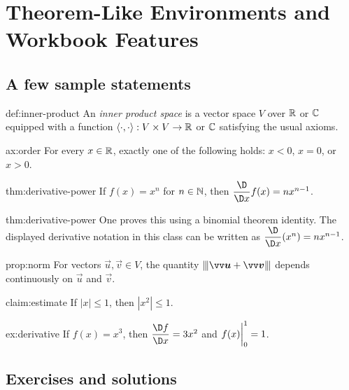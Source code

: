 \chapter{Theorem-Like Environments and Workbook Features}

\section{A few sample statements}

\begin{defn}{def:inner-product}
An \emph{inner product space} is a vector space $V$ over $\mathbb{R}$ or $\mathbb{C}$ equipped with a function
$\left\langle \cdot,\cdot \right\rangle : V\times V \to \mathbb{R}$ or $\mathbb{C}$ satisfying the usual axioms.
\end{defn}

\begin{axiom}{ax:order}
For every $x \in \mathbb{R}$, exactly one of the following holds: $x<0$, $x=0$, or $x>0$.
\end{axiom}

\begin{theo}{thm:derivative-power}
If $f(x)=x^n$ for $n\in\mathbb{N}$, then $\dfrac{\D}{\D x}f(x)=nx^{n-1}$.
\end{theo}

\begin{prf}{thm:derivative-power}
One proves this using a binomial theorem identity. The displayed derivative
notation in this class can be written as $\ddx(x^n)=nx^{n-1}$.
\end{prf}

\begin{prop}{prop:norm}
For vectors $\vec{u}, \vec{v}\in V$, the quantity $\tripnorm \vec{u}+\vec{v} \tripnorm$ depends continuously on $\vec{u}$ and $\vec{v}$.
\end{prop}

\begin{claim}{claim:estimate}
If $|x|\le 1$, then $|x^2|\le 1$.
\end{claim}

\begin{exmpl}{ex:derivative}
If $f(x)=x^3$, then $\dfdx=3x^2$ and $f(x)\biggr|_{0}^{1}=1$.
\end{exmpl}

\section{Exercises and solutions}

